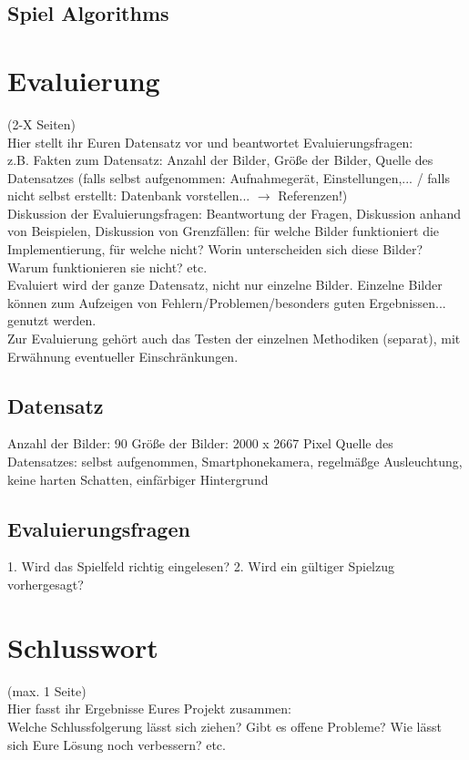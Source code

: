 \documentclass[paper=A4, deutsch]{scrartcl}
\begin{document}
\subsection{Spiel Algorithms}



\section{Evaluierung}
(2-X Seiten)\\
Hier stellt ihr Euren Datensatz vor und beantwortet Evaluierungsfragen:\\
z.B. Fakten zum Datensatz: Anzahl der Bilder, Größe der Bilder, Quelle des Datensatzes (falls selbst aufgenommen: Aufnahmegerät, Einstellungen,... / falls nicht selbst erstellt: Datenbank vorstellen... $\to$ Referenzen!)\\
Diskussion der Evaluierungsfragen: Beantwortung der Fragen, Diskussion anhand von Beispielen, Diskussion von Grenzfällen: für welche Bilder funktioniert die Implementierung, für welche nicht? Worin unterscheiden sich diese Bilder? Warum funktionieren sie nicht? etc.\\
Evaluiert wird der ganze Datensatz, nicht nur einzelne Bilder. Einzelne Bilder können zum Aufzeigen von Fehlern/Problemen/besonders guten Ergebnissen... genutzt werden.\\
Zur Evaluierung gehört auch das Testen der einzelnen Methodiken (separat), mit Erwähnung eventueller Einschränkungen.

\subsection{Datensatz}
Anzahl der Bilder: 90
Größe der Bilder: 2000 x 2667 Pixel
Quelle des Datensatzes: selbst aufgenommen, Smartphonekamera, regelmäßge Ausleuchtung, keine harten Schatten, einfärbiger Hintergrund

\subsection{Evaluierungsfragen}
1. Wird das Spielfeld richtig eingelesen?
2. Wird ein gültiger Spielzug vorhergesagt?



\section{Schlusswort}
(max. 1 Seite)\\
Hier fasst ihr Ergebnisse Eures Projekt zusammen:\\
Welche Schlussfolgerung lässt sich ziehen? Gibt es offene Probleme? Wie lässt sich Eure Lösung noch verbessern? etc.
\end{document}
